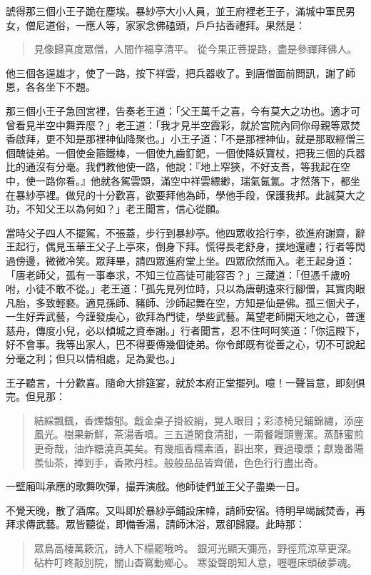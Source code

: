 諕得那三個小王子跪在塵埃。暴紗亭大小人員，並王府裡老王子，滿城中軍民男女，僧尼道俗，一應人等，家家念佛磕頭，戶戶拈香禮拜。果然是：
\begin{quote}
見像歸真度眾僧，人間作福享清平。
從今果正菩提路，盡是參禪拜佛人。
\end{quote}

他三個各逞雄才，使了一路，按下祥雲，把兵器收了。到唐僧面前問訊，謝了師恩，各各坐下不題。

那三個小王子急回宮裡，告奏老王道：「父王萬千之喜，今有莫大之功也。適才可曾看見半空中舞弄麼？」老王道：「我才見半空霞彩，就於宮院內同你母親等眾焚香啟拜，更不知是那裡神仙降聚也。」小王子道：「不是那裡神仙，就是那取經僧三個醜徒弟。一個使金箍鐵棒，一個使九齒釘鈀，一個使降妖寶杖，把我三個的兵器比的通沒有分毫。我們教他使一路，他說：『地上窄狹，不好支吾，等我起在空中，使一路你看。』他就各駕雲頭，滿空中祥雲縹緲，瑞氣氤氳。才然落下，都坐在暴紗亭裡。做兒的十分歡喜，欲要拜他為師，學他手段，保護我邦。此誠莫大之功，不知父王以為何如？」老王聞言，信心從願。

當時父子四人不擺駕，不張蓋，步行到暴紗亭。他四眾收拾行李，欲進府謝齋，辭王起行，偶見玉華王父子上亭來，倒身下拜。慌得長老舒身，撲地還禮；行者等閃過傍邊，微微冷笑。眾拜畢，請四眾進府堂上坐。四眾欣然而入。老王起身道：「唐老師父，孤有一事奉求，不知三位高徒可能容否？」三藏道：「但憑千歲吩咐，小徒不敢不從。」老王道：「孤先見列位時，只以為唐朝遠來行腳僧，其實肉眼凡胎，多致輕褻。適見孫師、豬師、沙師起舞在空，方知是仙是佛。孤三個犬子，一生好弄武藝，今謹發虔心，欲拜為門徒，學些武藝。萬望老師開天地之心，普運慈舟，傳度小兒，必以傾城之資奉謝。」行者聞言，忍不住呵呵笑道：「你這殿下，好不會事。我等出家人，巴不得要傳幾個徒弟。你令郎既有從善之心，切不可說起分毫之利；但只以情相處，足為愛也。」

王子聽言，十分歡喜。隨命大排筵宴，就於本府正堂擺列。噫！一聲旨意，即刻俱完。但見那：
\begin{quote}
結綵飄颻，香煙馥郁。戧金桌子掛絞綃，晃人眼目；彩漆椅兒鋪錦繡，添座風光。樹果新鮮，茶湯香噴。三五道閑食清甜，一兩餐饅頭豐潔。蒸酥蜜煎更奇哉，油炸糖澆真美矣。有幾瓶香糯素酒，斟出來，賽過瓊漿；獻幾番陽羨仙茶，捧到手，香欺丹桂。般般品品皆齊備，色色行行盡出奇。
\end{quote}

一壁廂叫承應的歌舞吹彈，撮弄演戲。他師徒們並王父子盡樂一日。

不覺天晚，散了酒席。又叫即於暴紗亭鋪設床幃，請師安宿。待明早竭誠焚香，再拜求傳武藝。眾皆聽從，即備香湯，請師沐浴，眾卻歸寢。此時那：
\begin{quote}
眾鳥高棲萬簌沉，詩人下榻罷哦吟。
銀河光顯天彌亮，野徑荒涼草更深。
砧杵叮咚敲別院，關山杳窵動鄉心。
寒蛩聲朗知人意，嚦嚦床頭破夢魂。
\end{quote}


